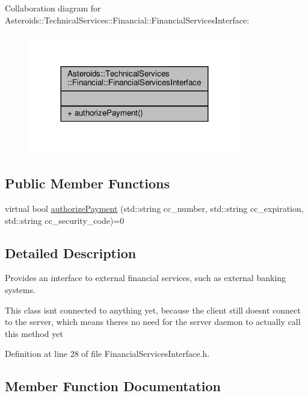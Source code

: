 Collaboration diagram for Asteroids\+:\+:Technical\+Services\+:\+:Financial\+:\+:Financial\+Services\+Interface\+:\nopagebreak
\begin{figure}[H]
\begin{center}
\leavevmode
\includegraphics[width=263pt]{classAsteroids_1_1TechnicalServices_1_1Financial_1_1FinancialServicesInterface__coll__graph}
\end{center}
\end{figure}
\subsection*{Public Member Functions}
\begin{DoxyCompactItemize}
\item 
virtual bool \hyperlink{classAsteroids_1_1TechnicalServices_1_1Financial_1_1FinancialServicesInterface_a4ad6d97c302ed9dc22b3528e56485d7d}{authorize\+Payment} (std\+::string cc\+\_\+number, std\+::string cc\+\_\+expiration, std\+::string cc\+\_\+security\+\_\+code)=0
\end{DoxyCompactItemize}


\subsection{Detailed Description}
Provides an interface to external financial services, such as external banking systems. 

This class isn\textquotesingle{}t connected to anything yet, because the client still doesn\textquotesingle{}t connect to the server, which means there\textquotesingle{}s no need for the server daemon to actually call this method yet 

Definition at line 28 of file Financial\+Services\+Interface.\+h.



\subsection{Member Function Documentation}
\mbox{\label{classAsteroids_1_1TechnicalServices_1_1Financial_1_1FinancialServicesInterface_a4ad6d97c302ed9dc22b3528e56485d7d}} 

